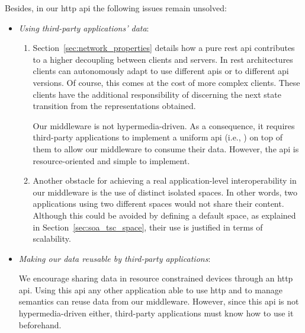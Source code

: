 Besides, in our \ac{http} \ac{api} the following issues remain unsolved:
\begin{itemize} %
  \item \emph{Using third-party applications' data}:
  \begin{enumerate}
    \item Section~\ref{sec:network_properties} details how a pure \ac{rest} \ac{api} contributes to a higher decoupling between clients and servers.
	  In \ac{rest} architectures clients can autonomously adapt to use different \acp{api} or to different \ac{api} versions. %
	  Of course, this comes at the cost of more complex clients.
	  These clients have the additional responsibility of discerning the next state transition from the representations obtained. %
	  
	  Our middleware is not hypermedia-driven.
	  As a consequence, it requires third-party applications to implement a uniform \ac{api} (i.e., \osapi{}) on top of them to allow our middleware to consume their data.
	  However, the \ac{api} is resource-oriented and simple to implement.
	  
    \item Another obstacle for achieving a real application-level interoperability in our middleware is the use of distinct isolated spaces.
	  In other words, two applications using two different spaces would not share their content.
	  Although this could be avoided by defining a default space, as explained in Section~\ref{sec:soa_tsc_space}, their use is justified in terms of scalability.
  \end{enumerate}
  
  \item \emph{Making our data reusable by third-party applications}:
	
	We encourage sharing data in resource constrained devices through an \ac{http} \ac{api}.
	Using this \ac{api} any other application able to use \ac{http} and to manage semantics can reuse data from our middleware.
	However, since this \ac{api} is not hypermedia-driven either, 
	third-party applications must know how to use it beforehand. %
\end{itemize}


